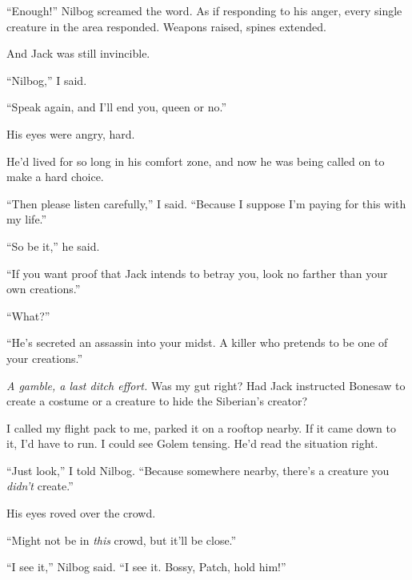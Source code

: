 ``Enough!''  Nilbog screamed the word.  As if responding to his anger, every single creature in the area responded.  Weapons raised, spines extended.



And Jack was still invincible.



``Nilbog,'' I said.



``Speak again, and I'll end you, queen or no.''



His eyes were angry, hard.



He'd lived for so long in his comfort zone, and now he was being called on to make a hard choice.



``Then please listen carefully,'' I said.  ``Because I suppose I'm paying for this with my life.''



``So be it,'' he said.



``If you want proof that Jack intends to betray you, look no farther than your own creations.''



``What?''



``He's secreted an assassin into your midst.  A killer who pretends to be one of your creations.''



\emph{A gamble, a last ditch effort.  }Was my gut right?  Had Jack instructed Bonesaw to create a costume or a creature to hide the Siberian's creator?



I called my flight pack to me, parked it on a rooftop nearby.  If it came down to it, I'd have to run.  I could see Golem tensing.  He'd read the situation right.



``Just look,'' I told Nilbog.  ``Because somewhere nearby, there's a creature you \emph{didn't} create.''



His eyes roved over the crowd.



``Might not be in \emph{this} crowd, but it'll be close.''



``I see it,'' Nilbog said.  ``I see it.  Bossy, Patch, hold him!''



